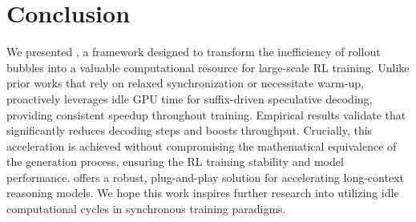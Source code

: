\section{Conclusion}

We presented \model, a framework designed to transform the inefficiency of rollout bubbles into a valuable computational resource for large-scale RL training. Unlike prior works that rely on relaxed synchronization or necessitate warm-up, \model proactively leverages idle GPU time for suffix-driven speculative decoding, providing consistent speedup throughout training. Empirical results validate that \model significantly reduces decoding steps and boosts throughput. Crucially, this acceleration is achieved without compromising the mathematical equivalence of the generation process, ensuring the RL training stability and model performance. 
\model offers a robust, plug-and-play solution for accelerating long-context reasoning models. We hope this work inspires further research into utilizing idle computational cycles in synchronous training paradigms.